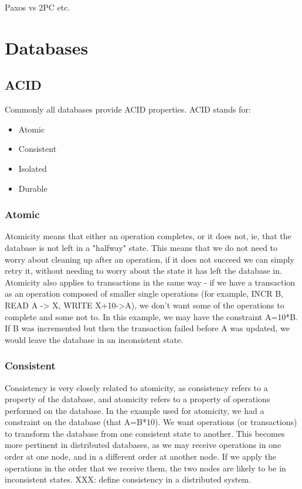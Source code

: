 \documentclass[12pt,twoside,notitlepage]{report}
\begin{document}
Paxos vs 2PC etc.

\section{Databases}

\subsection{ACID}

Commonly all databases provide ACID properties. ACID stands for:

\begin{itemize}
\item Atomic
\item Consistent
\item Isolated
\item Durable
\end{itemize}

\subsubsection*{Atomic}

Atomicity means that either an operation completes, or it does not, ie, that the database is not
left in a "halfway" state. This means that we do not need to worry about cleaning up after an
operation, if it does not succeed we can simply retry it, without needing to worry about the state
it has left the database in. Atomicity also applies to transactions in the same way - if we have
a transaction as an operation composed of smaller single operations (for example, INCR B, READ A
-> X, WRITE X+10->A), we don't want some of the operations to complete and some not to. In this
example, we may have the constraint A=10*B. If B was incremented but then the transaction failed
before A was updated, we would leave the database in an inconsistent state.

\subsubsection*{Consistent}

Consistency is very closely related to atomicity, as consistency refers to a property of the
database, and atomicity refers to a property of operations performed on the database. In the
example used for atomicity, we had a constraint on the database (that A=B*10). We want operations
(or transactions) to transform the database from one consistent state to another. This becomes
more pertinent in distributed databases, as we may receive operations in one order at one node,
and in a different order at another node. If we apply the operations in the order that we receive
them, the two nodes are likely to be in inconsistent states. XXX: define consistency in a
distributed system.
\end{document}
